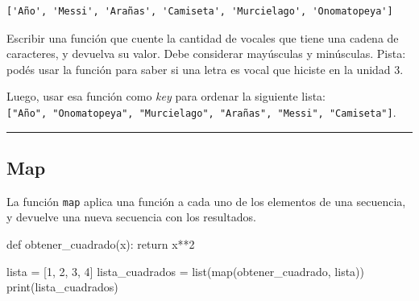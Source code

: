 \documentclass[
  letterpaper,
  DIV=11,
  numbers=noendperiod]{scrreprt}
\newenvironment{Shaded}{\begin{snugshade}}{\end{snugshade}}
\newcommand{\BuiltInTok}[1]{\textcolor[rgb]{0.00,0.23,0.31}{#1}}
\newcommand{\ControlFlowTok}[1]{\textcolor[rgb]{0.00,0.23,0.31}{#1}}
\newcommand{\DecValTok}[1]{\textcolor[rgb]{0.68,0.00,0.00}{#1}}
\newcommand{\KeywordTok}[1]{\textcolor[rgb]{0.00,0.23,0.31}{#1}}
\newcommand{\NormalTok}[1]{\textcolor[rgb]{0.00,0.23,0.31}{#1}}
\newcommand{\OperatorTok}[1]{\textcolor[rgb]{0.37,0.37,0.37}{#1}}
\begin{document}
\begin{verbatim}
['Año', 'Messi', 'Arañas', 'Camiseta', 'Murcielago', 'Onomatopeya']
\end{verbatim}

\begin{tcolorbox}[enhanced jigsaw, bottomrule=.15mm, leftrule=.75mm, opacityback=0, colback=white, toprule=.15mm, bottomtitle=1mm, opacitybacktitle=0.6, rightrule=.15mm, left=2mm, arc=.35mm, coltitle=black, title=\textcolor{quarto-callout-important-color}{\faExclamation}\hspace{0.5em}{Ejercicio Desafío}, breakable, toptitle=1mm, colframe=quarto-callout-important-color-frame, titlerule=0mm, colbacktitle=quarto-callout-important-color!10!white]

Escribir una función que cuente la cantidad de vocales que tiene una
cadena de caracteres, y devuelva su valor. Debe considerar mayúsculas y
minúsculas. Pista: podés usar la función para saber si una letra es
vocal que hiciste en la unidad 3.

Luego, usar esa función como \emph{key} para ordenar la siguiente lista:
\texttt{{[}"Año",\ "Onomatopeya",\ "Murcielago",\ "Arañas",\ "Messi",\ "Camiseta"{]}}.\\

\end{tcolorbox}

\hfill\break

\begin{center}\rule{0.5\linewidth}{0.5pt}\end{center}

\hfill\break

\subsection{Map}\label{map}

La función \texttt{map} aplica una función a cada uno de los elementos
de una secuencia, y devuelve una nueva secuencia con los resultados.

\begin{Shaded}
\begin{Highlighting}[]
\KeywordTok{def}\NormalTok{ obtener\_cuadrado(x):}
  \ControlFlowTok{return}\NormalTok{ x}\OperatorTok{**}\DecValTok{2}

\NormalTok{lista }\OperatorTok{=}\NormalTok{ [}\DecValTok{1}\NormalTok{, }\DecValTok{2}\NormalTok{, }\DecValTok{3}\NormalTok{, }\DecValTok{4}\NormalTok{]}
\NormalTok{lista\_cuadrados }\OperatorTok{=} \BuiltInTok{list}\NormalTok{(}\BuiltInTok{map}\NormalTok{(obtener\_cuadrado, lista))}
\BuiltInTok{print}\NormalTok{(lista\_cuadrados)}
\end{Highlighting}
\end{Shaded}
\end{document}
